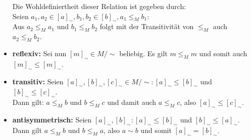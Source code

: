 \begin{solution}
\begin{itemize}
  Die Wohldefiniertheit dieser Relation ist gegeben durch: \\
  Seien $a_1, a_2 \in [a]_{\sim}, b_1, b_2 \in [b]_{\sim}, a_1 \leq_M b_1$: \\
  Aus $a_2 \leq_M a_1$ und $b_1 \leq_M b_2$ folgt mit der Transitivität von $\leq_M$ auch $a_2 \leq_M b_2$. \\
  \item \textbf{reflexiv:} Sei nun $[m]_{\sim} \in M/\sim$ beliebig. Es gilt $m \leq_M m$ und somit auch $[m]_{\sim} \leq [m]_{\sim}$.
  \item \textbf{transitiv:} Seien $[a]_{\sim},[b]_{\sim},[c]_{\sim} \in M/\sim: [a]_{\sim} \leq [b]_{\sim}$ und
  $[b]_{\sim} \leq [c]_{\sim}$. \\
  Dann gilt: $a \leq_M b$ und $b \leq_M c$ und damit auch $a \leq_M c$, also $[a]_{\sim} \leq [c]_{\sim}$.
  \item \textbf{antisymmetrisch:} Seien $[a]_{\sim},[b]_{\sim}: [a]_{\sim} \leq [b]_{\sim}$ und $ [b]_{\sim} \leq [a]_{\sim}$. \\
  Dann gilt $a \leq_M b$ und $b \leq_M a$, also $a \sim b$ und somit $[a]_{\sim} = [b]_{\sim}$.
\end{itemize}
\end{solution}
